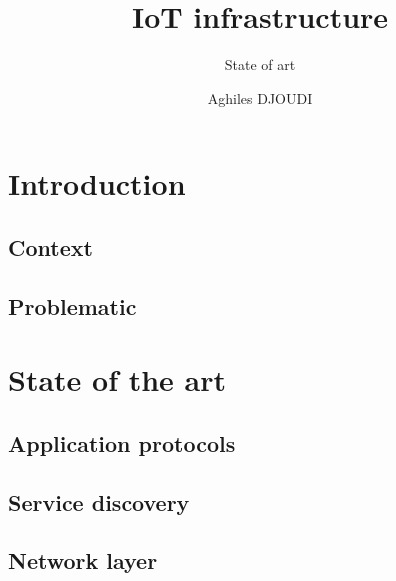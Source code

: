 \documentclass[8pt]{beamer}
\begin{document}
\title{IoT infrastructure}
\subtitle{State of art}
\author{Aghiles DJOUDI}

\firstpage

\section{Introduction}
	\subsection*{Context}
		
	\subsection*{Problematic}
		
%		
%		
%		

\tableofcontent

\section{State of the art}
		
	\subsection{Application protocols}
		
		
	\subsection{Service discovery}
		
	\subsection{Network layer}
		
%		
\end{document}
